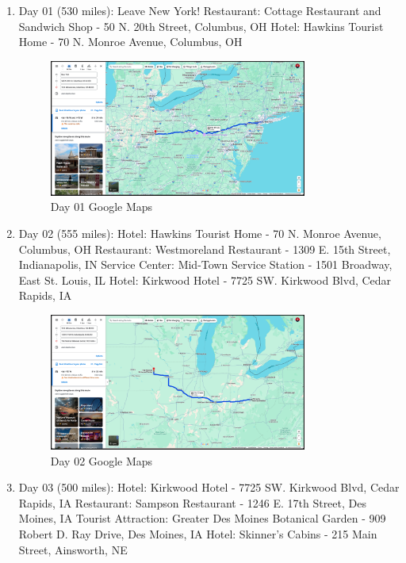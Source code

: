 \begin{enumerate}
	\item Day 01 (530 miles):
		\subitem Leave New York!
		\subitem Restaurant: Cottage Restaurant and Sandwich Shop - 50 N. 20th Street, Columbus, OH
		\subitem Hotel: Hawkins Tourist Home - 70 N. Monroe Avenue, Columbus, OH

		\begin{figure}[H]
			\centering
			\includegraphics[width=0.8\textwidth]{assets/day01.png}
			\caption{Day 01 Google Maps}
			\label{fig:day01}
		\end{figure}
	\item Day 02 (555 miles):
		\subitem Hotel: Hawkins Tourist Home - 70 N. Monroe Avenue, Columbus, OH
		\subitem Restaurant: Westmoreland Restaurant - 1309 E. 15th Street, Indianapolis, IN
		\subitem Service Center: Mid-Town Service Station - 1501 Broadway, East St. Louis, IL
		\subitem Hotel: Kirkwood Hotel - 7725 SW. Kirkwood Blvd, Cedar Rapids, IA

		\begin{figure}[H]
			\centering
			\includegraphics[width=0.8\textwidth]{assets/day02.png}
			\caption{Day 02 Google Maps}
			\label{fig:day02}
		\end{figure}
	\item Day 03 (500 miles):
		\subitem Hotel: Kirkwood Hotel - 7725 SW. Kirkwood Blvd, Cedar Rapids, IA
		\subitem Restaurant: Sampson Restaurant - 1246 E. 17th Street, Des Moines, IA
		\subitem Tourist Attraction: Greater Des Moines Botanical Garden - 909 Robert D. Ray Drive, Des Moines, IA
		\subitem Hotel: Skinner's Cabins - 215 Main Street, Ainsworth, NE


\end{enumerate}
